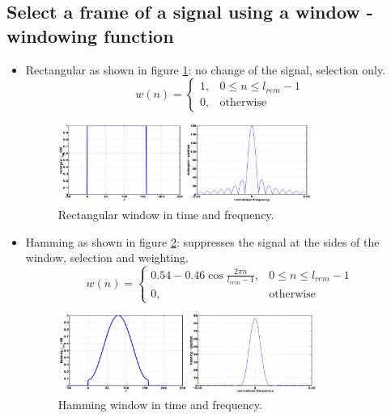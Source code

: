 \documentclass[12pt, a4paper, twoside]{report}
\begin{document}
\subsection{Select a frame of a signal using a window - windowing function}
\begin{itemize}[noitemsep]
\item Rectangular as shown in figure \ref{fig:rect-freq-time}: no change of the signal, selection only.
\begin{equation}
w(n) =
\begin{cases}
1, & 0 \leq n \leq l_{rem} -1 \\
0, & \text{otherwise}
\end{cases}
\end{equation}
\begin{figure}[!h]
	\centering
	\includegraphics[width=0.8\textwidth]
	{images/chapter2/rect-freq-time}
	\caption{Rectangular window in time and frequency.}
	\label{fig:rect-freq-time}
\end{figure}

\item Hamming as shown in figure \ref{fig:hamm-freq-time}: suppresses the signal at the sides of the window, selection and weighting.
\begin{equation}
w(n) =
\begin{cases}
0.54 - 0.46 \cos \frac{2 \pi n}{l_{rem} - 1}, & 0 \leq n \leq l_{rem} -1 \\
0, & \text{otherwise}
\end{cases}
\end{equation}
\begin{figure}[!h]
	\centering
	\includegraphics[width=0.8\textwidth]
	{images/chapter2/hamm-freq-time}
	\caption{Hamming window in time and frequency.}
	\label{fig:hamm-freq-time}
\end{figure}
\end{itemize}
\end{document}
